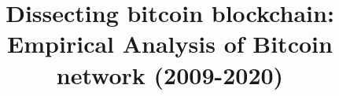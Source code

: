 \documentclass[preprint,12pt]{elsarticle}
\begin{document}
\begin{frontmatter}


\title{Dissecting bitcoin blockchain: Empirical Analysis of Bitcoin network (2009-2020)}








\end{frontmatter}
\end{document}
